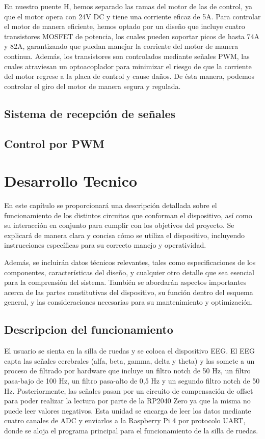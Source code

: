 \documentclass{article}
\begin{document}
En nuestro puente H, hemos separado las ramas del motor de las de control, ya que el motor opera con 24V DC y tiene una corriente eficaz de 5A. Para controlar el motor de manera eficiente, hemos optado por un diseño que incluye cuatro transistores MOSFET de potencia, los cuales pueden soportar picos de hasta 74A y 82A, garantizando que puedan manejar la corriente del motor de manera continua. Además, los transistores son controlados mediante señales PWM, las cuales atraviesan un optoacoplador para minimizar el riesgo de que la corriente del motor regrese a la placa de control y cause daños. De ésta manera, podemos controlar el giro del motor de manera segura y regulada.


\subsection{Sistema de recepción de señales}

\subsection{Control por PWM}

\section{Desarrollo Tecnico}
En este capítulo se proporcionará una descripción detallada sobre el funcionamiento de los distintos circuitos que conforman el dispositivo, así como su interacción en conjunto para cumplir con los objetivos del proyecto. Se explicará de manera clara y concisa cómo se utiliza el dispositivo, incluyendo instrucciones específicas para su correcto manejo y operatividad.

Además, se incluirán datos técnicos relevantes, tales como especificaciones de los componentes, características del diseño, y cualquier otro detalle que sea esencial para la comprensión del sistema. También se abordarán aspectos importantes acerca de las partes constitutivas del dispositivo, su función dentro del esquema general, y las consideraciones necesarias para su mantenimiento y optimización.

\subsection{Descripcion del funcionamiento}
El usuario se sienta en la silla de ruedas y se coloca el dispositivo EEG. El EEG capta las señales cerebrales (alfa, beta, gamma, delta y theta) y las somete a un proceso de filtrado por hardware que incluye un filtro notch de 50 Hz, un filtro pasa-bajo de 100 Hz, un filtro pasa-alto de 0,5 Hz y un segundo filtro notch de 50 Hz. Posteriormente, las señales pasan por un circuito de compensación de offset para poder realizar la lectura por parte de la RP2040 Zero ya que la misma no puede leer valores negativos. Esta unidad se encarga de leer los datos mediante cuatro canales de ADC y enviarlos a la Raspberry Pi 4 por protocolo UART, donde se aloja el programa principal para el funcionamiento de la silla de ruedas.
\end{document}
